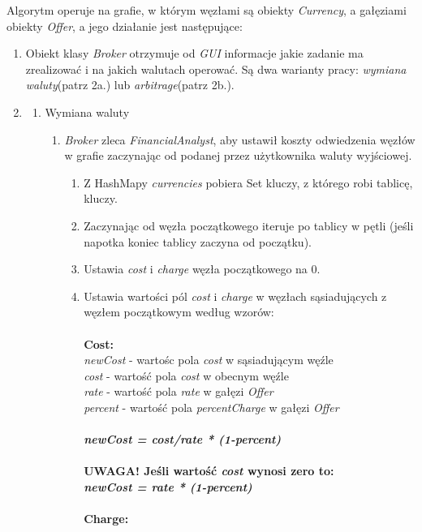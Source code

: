\documentclass[a4paper,11pt]{article}
\begin{document}
Algorytm operuje na grafie, w którym węzłami są obiekty \textit{Currency}, a gałęziami obiekty \textit{Offer}, a jego działanie jest następujące:
\begin{enumerate}

\item Obiekt klasy \textit{Broker} otrzymuje od \textit{GUI} informacje jakie zadanie ma zrealizować i na jakich walutach operować. Są dwa warianty pracy: \textit{wymiana waluty}(patrz 2a.) lub \textit{arbitrage}(patrz 2b.).
\item
\begin{enumerate}
\item Wymiana waluty

\begin{enumerate}
\item \textit{Broker} zleca \textit{FinancialAnalyst}, aby ustawił koszty odwiedzenia węzłów w grafie zaczynając od podanej przez użytkownika waluty wyjściowej.
\begin{enumerate}
\item Z HashMapy \textit{currencies} pobiera Set kluczy, z którego robi tablicę, kluczy.
\item Zaczynając od węzła początkowego iteruje po tablicy w pętli (jeśli napotka koniec tablicy zaczyna od początku).
\item Ustawia \textit{cost} i \textit{charge} węzła początkowego na 0.
\item Ustawia wartości pól \textit{cost} i \textit{charge} w węzłach sąsiadujących z węzłem początkowym według wzorów:
\\
\\\textbf{Cost:}
\\\textit{newCost} - wartośc pola \textit{cost} w sąsiadującym węźle
\\ \textit{cost} - wartość pola \textit{cost} w obecnym węźle
\\ \textit{rate} - wartość pola \textit{rate} w gałęzi \textit{Offer}
\\ \textit{percent} - wartość pola \textit{percentCharge} w gałęzi \textit{Offer}
\\
\\ \textbf{\emph{newCost = cost/rate * (1-percent)}}
\\
\textbf{\\ UWAGA! Jeśli wartość \textit{cost} wynosi zero to:}
\\ \textbf{\emph{newCost = rate * (1-percent)}}
\\
\\\textbf{Charge:}

\end{enumerate}
\end{enumerate}
\end{enumerate}
\end{enumerate}
\end{document}
